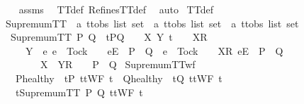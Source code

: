\begin{isabellebody}
%
\isadelimproof
\ \ %
\endisadelimproof
%
\isatagproof
{}\isamarkupfalse%
\ assms\ \isamarkupfalse%
\ TT{}{\isacharunderscore}def\ RefinesTT{\isacharunderscore}def\ \isamarkupfalse%
\ auto%
\endisatagproof
{\isafoldproof}%
%
\isadelimproof
\isanewline
%
\endisadelimproof
\isanewline
{}\isamarkupfalse%
\ TT{}{\isacharunderscore}def\isanewline
\isanewline
{}\isamarkupfalse%
\ SupremumTT\ {\isacharcolon}{\isacharcolon}\ {\isachardoublequoteopen}{\isacharprime}a\ ttobs\ list\ set\ {\isasymRightarrow}\ {\isacharprime}a\ ttobs\ list\ set\ {\isasymRightarrow}\ {\isacharprime}a\ ttobs\ list\ set{\isachardoublequoteclose}\ \isanewline
\ \ {\isachardoublequoteopen}SupremumTT\ P\ Q\ {\isacharequal}\ {\isacharbraceleft}t{\isasymin}P{\isasyminter}Q{\isachardot}\ {\isasymforall}\ {\isasymrho}\ {\isasymsigma}\ X\ Y{\isachardot}\ t\ {\isacharequal}\ {\isasymrho}\ {\isacharat}\ {\isacharbrackleft}{\isacharbrackleft}X{\isacharbrackright}\isactrlsub R{\isacharbrackright}\ {\isacharat}\ {\isasymsigma}\isanewline
\ \ \ \ {\isasymand}\ Y\ {\isasyminter}\ {\isacharbraceleft}e{\isachardot}\ e\ {\isasymnoteq}\ Tock\ {\isasymand}\ {\isasymrho}\ {\isacharat}\ {\isacharbrackleft}{\isacharbrackleft}e{\isacharbrackright}\isactrlsub E{\isacharbrackright}\ {\isasymin}\ P\ {\isasyminter}\ Q\ {\isasymor}\ e\ {\isacharequal}\ Tock\ {\isasymand}\ {\isasymrho}\ {\isacharat}\ {\isacharbrackleft}{\isacharbrackleft}X{\isacharbrackright}\isactrlsub R{\isacharcomma}\ {\isacharbrackleft}e{\isacharbrackright}\isactrlsub E{\isacharbrackright}\ {\isasymin}\ P\ {\isasyminter}\ Q{\isacharbraceright}\ {\isacharequal}\ {\isacharbraceleft}{\isacharbraceright}\ {\isasymlongrightarrow}\isanewline
\ \ \ \ \ \ {\isasymrho}\ {\isacharat}\ {\isacharbrackleft}{\isacharbrackleft}X\ {\isasymunion}\ Y{\isacharbrackright}\isactrlsub R{\isacharbrackright}\ {\isacharat}\ {\isasymsigma}\ {\isasymin}\ P\ {\isasyminter}\ Q{\isacharbraceright}{\isachardoublequoteclose}\isanewline
\isanewline
{}\isamarkupfalse%
\ SupremumTT{\isacharunderscore}wf{\isacharcolon}\isanewline
\ \ \ P{\isacharunderscore}healthy{\isacharcolon}\ {\isachardoublequoteopen}{\isasymforall}\ t{\isasymin}P{\isachardot}\ ttWF\ t{\isachardoublequoteclose}\ \ Q{\isacharunderscore}healthy{\isacharcolon}\ {\isachardoublequoteopen}{\isasymforall}\ t{\isasymin}Q{\isachardot}\ ttWF\ t{\isachardoublequoteclose}\isanewline
\ \ \ {\isachardoublequoteopen}{\isasymforall}t{\isasymin}SupremumTT\ P\ Q{\isachardot}\ ttWF\ t{\isachardoublequoteclose}\isanewline

\end{isabellebody}
